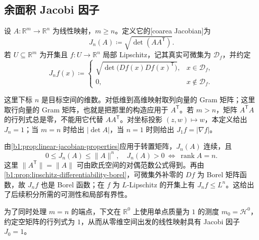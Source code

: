 \subsection{余面积 Jacobi 因子}
\label{b1:subsec:180104}

\begin{definition}
\label{b1:def:coarea-jacobian}
设 \(A:\mathbb R^m\rightarrow\mathbb R^n\) 为线性映射，\(m\geq n\)。定义它的[coarea Jacobian]为
\[
 J_n(A)\coloneqq\sqrt{\det(AA^{\mathsf T})}.
\]
若 \(U\subseteq\mathbb R^m\) 为开集且 \(f:U\rightarrow\mathbb R^n\) 局部 Lipschitz，记其真实可微集为 \(\mathcal D_f\)，并约定
\[
 J_nf(x)\coloneqq
 \begin{cases}
 \sqrt{\det\bigl(Df(x)Df(x)^{\mathsf T}\bigr)},&x\in\mathcal D_f,\\
 0,&x\notin\mathcal D_f.
 \end{cases}
\]
\end{definition}

这里下标 \(n\) 是目标空间的维数。对低维到高维映射取列向量的 Gram 矩阵；这里取行向量的 Gram 矩阵，也就是把那里的构造应用于 \(A^{\mathsf T}\)。若 \(m>n\)，矩阵 \(A^{\mathsf T}A\) 的行列式总是零，不能用它代替 \(AA^{\mathsf T}\)。对坐标投影 \((z,w)\mapsto w\)，本定义给出 \(J_n=1\)；当 \(m=n\) 时给出 \(|\det A|\)，当 \(n=1\) 时则给出 \(J_1f=|\nabla f|\)。

\ProseParagraphBreak

由\cref{b1:prop:linear-jacobian-properties}应用于转置矩阵，\(J_n(A)\) 连续，且
\[
 0\leq J_n(A)\leq\|A\|^n,\quad
 J_n(A)>0\ \Longleftrightarrow\ \operatorname{rank}A=n.
\]
这里 \(\|A^{\mathsf T}\|=\|A\|\) 可由欧氏空间的对偶范数公式得到。再由\cref{b1:prop:lipschitz-differentiability-borel}，可微集外补零的 \(Df\) 为 Borel 矩阵函数，故 \(J_nf\) 也是 Borel 函数；在 \(f\) 为 \(L\)-Lipschitz 的开集上有 \(J_nf\leq L^n\)。这给出了后续积分所需的可测性和局部有界性。

\ProseParagraphBreak

为了同时处理 \(m=n\) 的端点，下文在 \(\mathbb R^0\) 上使用单点质量为 \(1\) 的测度 \(m_0=\mathcal H^0\)，约定空矩阵的行列式为 \(1\)，从而从零维空间出发的线性映射具有 Jacobi 因子 \(J_0=1\)。

